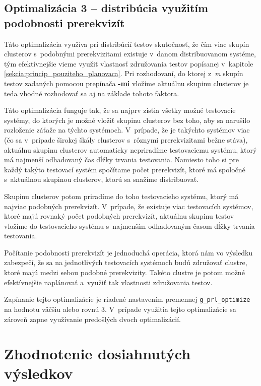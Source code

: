 \section{Optimalizácia 3 -- distribúcia využitím podobnosti prerekvizít}
\label{sekcia:optimalizacia3}
Táto optimalizácia využíva pri distribúcií testov skutočnosť, že čím viac
skupín clusterov s~podobnými prerekvizitami existuje v~danom distribuovanom systéme,
tým efektívnejšie vieme využiť vlastnosť združovania testov popísanej v~kapitole 
\ref{sekcia:princip_pouziteho_planovaca}.
Pri rozhodovaní, do ktorej z~\textit{m} skupín testov zadaných pomocou prepínača \textbf{-mi}
vložíme aktuálnu skupinu clusterov je teda vhodné rozhodovať sa aj na základe tohoto faktora.

Táto optimalizácia funguje tak, že sa najprv zistia všetky možné testovacie systémy,
do ktorých je možné vložiť skupinu clusterov bez toho, aby sa narušilo
rozloženie záťaže na týchto systémoch. V~prípade, že je takýchto systémov viac
(čo sa v~prípade širokej škály clusterov s~rôznymi prerekvizitami bežne stáva),
aktuálnu skupinu clusterov automaticky nepriradíme testovaciemu systému, 
ktorý má najmenší odhadovaný čas dĺžky trvania testovania. Namiesto toho si pre každý takýto
testovací systém spočítame počet prerekvizít, ktoré má spoločné s~aktuálnou skupinou
clusterov, ktorú sa snažíme distribuovať. 

Skupinu clusterov potom priradíme do toho testovacieho systému, ktorý má najviac
podobných prerekvizít. V~prípade, že existuje viac testovacích systémov, ktoré
majú rovnaký počet podobných prerekvizít, aktuálnu skupinu testov vložíme do 
testovacieho systému s~najmenším odhadovaným časom dĺžky trvania testovania.

Počítanie podobnosti prerekvizít je jednoduchá operácia, ktorá nám vo výsledku 
zabezpečí, že sa na jednotlivých testovacích systémoch budú združovať clustre,
ktoré majú medzi sebou podobné prerekvizity. Takéto clustre je potom možné efektívnejšie
naplánovať a~využiť tak vlastnosti združovania testov.

Zapínanie tejto optimalizácie je riadené nastavením premennej \texttt{g\_prl\_optimize} na hodnotu 
väčšiu alebo rovnú 3. V~prípade využitia tejto optimalizácie sa zároveň zapne
využívanie predošlých dvoch optimalizácií.


%
%
\chapter{Zhodnotenie dosiahnutých výsledkov}
\label{kapitola:zhodnotenie_vysledkov}

